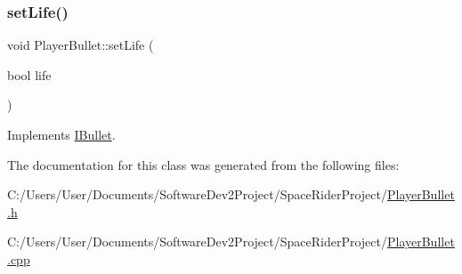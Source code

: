 \mbox{\label{class_player_bullet_af713549c4bb9a2400a7929564f5b81ff}} 
\subsubsection{\texorpdfstring{set\+Life()}{setLife()}}
{\footnotesize\ttfamily void Player\+Bullet\+::set\+Life (\begin{DoxyParamCaption}\item[{bool}]{life }\end{DoxyParamCaption})\hspace{0.3cm}{\ttfamily [virtual]}}



Implements \hyperlink{class_i_bullet_abf99befdaa121e7c9ca2acc2ed75b513}{I\+Bullet}.



The documentation for this class was generated from the following files\+:\begin{DoxyCompactItemize}
\item 
C\+:/\+Users/\+User/\+Documents/\+Software\+Dev2\+Project/\+Space\+Rider\+Project/\hyperlink{_player_bullet_8h}{Player\+Bullet.\+h}\item 
C\+:/\+Users/\+User/\+Documents/\+Software\+Dev2\+Project/\+Space\+Rider\+Project/\hyperlink{_player_bullet_8cpp}{Player\+Bullet.\+cpp}\end{DoxyCompactItemize}
